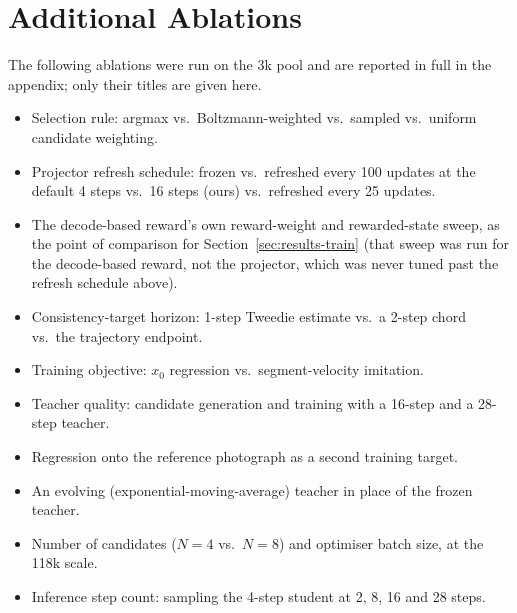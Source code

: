 \documentclass{article} %
\begin{document}
\section{Additional Ablations}
\label{sec:appendix-titles}
The following ablations were run on the 3k pool and are reported in full in the appendix; only
their titles are given here.
\begin{itemize}
\item Selection rule: argmax vs.\ Boltzmann-weighted vs.\ sampled vs.\ uniform candidate weighting.
\item Projector refresh schedule: frozen vs.\ refreshed every 100 updates at the default 4 steps vs.\
  16 steps (ours) vs.\ refreshed every 25 updates.
\item The decode-based reward's own reward-weight and rewarded-state sweep, as the point of
  comparison for Section~\ref{sec:results-train} (that sweep was run for the decode-based reward, not
  the projector, which was never tuned past the refresh schedule above).
\item Consistency-target horizon: 1-step Tweedie estimate vs.\ a 2-step chord vs.\ the trajectory endpoint.
\item Training objective: $x_0$ regression vs.\ segment-velocity imitation.
\item Teacher quality: candidate generation and training with a 16-step and a 28-step teacher.
\item Regression onto the reference photograph as a second training target.
\item An evolving (exponential-moving-average) teacher in place of the frozen teacher.
\item Number of candidates ($N{=}4$ vs.\ $N{=}8$) and optimiser batch size, at the 118k scale.
\item Inference step count: sampling the 4-step student at 2, 8, 16 and 28 steps.
\end{itemize}
\end{document}
